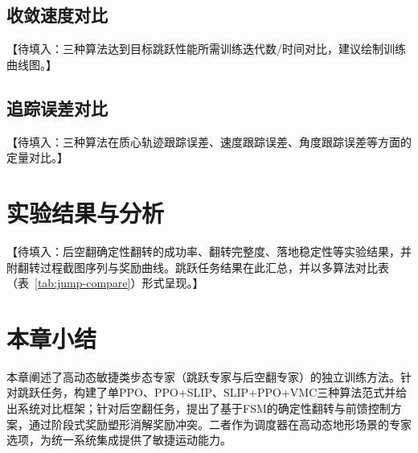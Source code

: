 \subsection{收敛速度对比}

【待填入：三种算法达到目标跳跃性能所需训练迭代数/时间对比，建议绘制训练曲线图。】

\subsection{追踪误差对比}

【待填入：三种算法在质心轨迹跟踪误差、速度跟踪误差、角度跟踪误差等方面的定量对比。】

\section{实验结果与分析}

【待填入：后空翻确定性翻转的成功率、翻转完整度、落地稳定性等实验结果，并附翻转过程截图序列与奖励曲线。跳跃任务结果在此汇总，并以多算法对比表（表~\ref{tab:jump-compare}）形式呈现。】

\begin{table}[!htbp]
    \centering
    \label{tab:jump-compare}
\end{table}

\section{本章小结}

本章阐述了高动态敏捷类步态专家（跳跃专家与后空翻专家）的独立训练方法。针对跳跃任务，构建了单PPO、PPO+SLIP、SLIP+PPO+VMC三种算法范式并给出系统对比框架；针对后空翻任务，提出了基于FSM的确定性翻转与前馈控制方案，通过阶段式奖励塑形消解奖励冲突。二者作为调度器在高动态地形场景的专家选项，为统一系统集成提供了敏捷运动能力。
